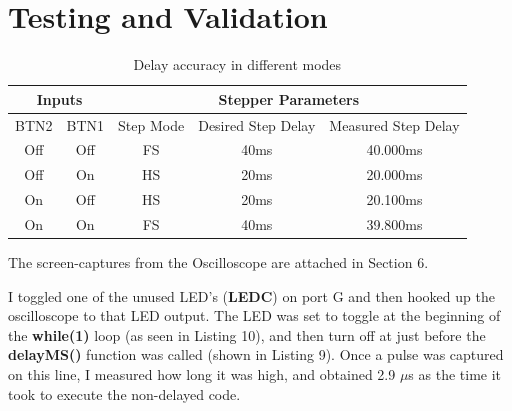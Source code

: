 \documentclass[a4paper, 12pt]{article}
\begin{document}
\section{Testing and Validation}
\begin{table}[h]
\centering
\begin{tabular}{cc|ccc}
\multicolumn{2}{c|}{\textbf{Inputs}} & \multicolumn{3}{c}{\textbf{Stepper Parameters}} \\
\hline
BTN2 & BTN1 & Step Mode & Desired Step Delay & Measured Step Delay \\
\hline
Off & Off & FS &  40ms & 40.000ms \\
Off & On & HS & 20ms & 20.000ms \\
On & Off & HS & 20ms & 20.100ms \\
On & On & FS & 40ms & 39.800ms \\
\end{tabular}
\caption{Delay accuracy in different modes}
\end{table}
The screen-captures from the Oscilloscope are attached in Section 6.

I toggled one of the unused LED's (\textbf{LEDC}) on port G and then hooked up the oscilloscope to that LED output. The LED was set to toggle at the beginning of the \textbf{while(1)} loop (as seen in Listing 10), and then turn off at just before the \textbf{delayMS()} function was called (shown in Listing 9). Once a pulse was captured on this line, I measured how long it was high, and obtained 2.9 $\mu$s as the time it took to execute the non-delayed code.
\end{document}
